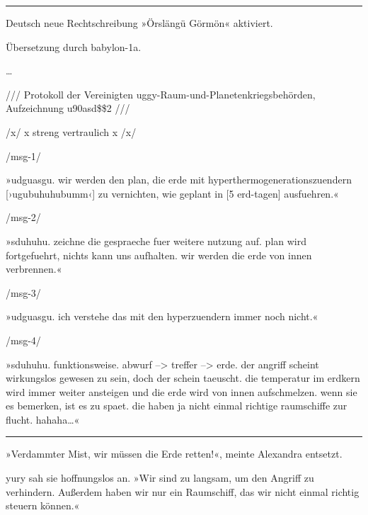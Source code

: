\noindent \parbox{\textwidth}{ \vspace{3ex} \hrule \vspace{3ex}

    \begin{footnotesize}
    \begin{ttfamily}

\noindent Deutsch neue Rechtschreibung »Örslängü Görmön« aktiviert.

\noindent Übersetzung durch babylon-1a.

\noindent …

\noindent /// Protokoll der Vereinigten uggy-Raum-und-Planetenkriegsbehörden, Aufzeichnung u90asd\$\$2 ///

\noindent /x/ x streng vertraulich x /x/

\noindent /msg-1/

\noindent »udguasgu. wir werden den plan, die erde mit hyperthermogenerationszuendern [›ugubuhuhubumm‹] zu vernichten, wie geplant in [5 erd-tagen] ausfuehren.«

\noindent /msg-2/

\noindent »sduhuhu. zeichne die gespraeche fuer weitere nutzung auf. plan wird fortgefuehrt, nichts kann uns aufhalten. wir werden die erde von innen verbrennen.«

\noindent /msg-3/

\noindent »udguasgu. ich verstehe das mit den hyperzuendern immer noch nicht.«

\noindent /msg-4/

\noindent »sduhuhu. funktionsweise. abwurf --> treffer --> erde. der angriff scheint wirkungslos gewesen zu sein, doch der schein taeuscht. die temperatur im erdkern wird immer weiter ansteigen und die erde wird von innen aufschmelzen. wenn sie es bemerken, ist es zu spaet. die haben ja nicht einmal richtige raumschiffe zur flucht. hahaha…«

    \end{ttfamily}
    \end{footnotesize}

\vspace{3ex} \hrule \vspace{3ex} }

»Verdammter Mist, wir müssen die Erde retten!«, meinte Alexandra entsetzt.

yury sah sie hoffnungslos an. »Wir sind zu langsam, um den Angriff zu verhindern. Außerdem haben wir nur ein Raumschiff, das wir nicht einmal richtig steuern können.«

